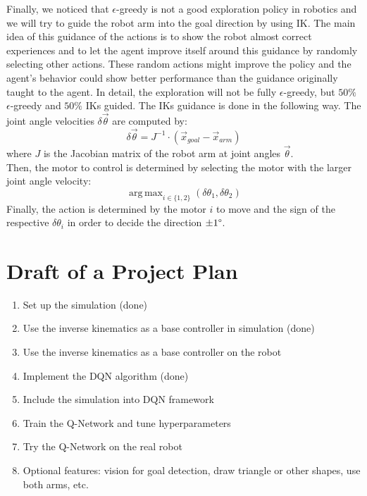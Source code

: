 \documentclass[a4paper,twoside, openright,12pt]{report}
\DeclareMathOperator*{\argmax}{arg\,max}
\begin{document}
Finally, we noticed that $\epsilon$-greedy is not a good exploration policy in robotics and we will try to guide the robot arm into the goal direction by using \ac{IK}. The main idea of this guidance of the actions is to show the robot almost correct experiences and to let the agent improve itself around this guidance by randomly selecting other actions. These random actions might improve the policy and the agent's behavior could show better performance than the guidance originally taught to the agent. In detail, the exploration will not be fully $\epsilon$-greedy, but $50\%$  $\epsilon$-greedy and $50\%$ \acp{IK} guided. The \acp{IK} guidance is done in the following way. The joint angle velocities $\delta \vec{\theta}$ are computed by:
\begin{equation}
\delta \vec{\theta} = J^{-1} \cdot (\vec{x}_{goal} - \vec{x}_{arm})
\end{equation}
where $J$ is the Jacobian matrix of the robot arm at joint angles $\vec{\theta}$.\\
Then, the motor to control is determined by selecting the motor with the larger joint angle velocity:
\begin{equation}
\argmax_{i \in \{1,2\}}(\delta \theta_1, \delta \theta_2)
\end{equation}
Finally, the action is determined by the motor $i$ to move and the sign of the respective $\delta \theta_i$ in order to decide the direction $\pm1\degree$.

\chapter*{Draft of a Project Plan}

\begin{enumerate}
\item Set up the simulation (done)
\item Use the inverse kinematics as a base controller in simulation (done)
\item Use the inverse kinematics as a base controller on the robot
\item Implement the \ac{DQN} algorithm (done)
\item Include the simulation into \ac{DQN} framework
\item Train the Q-Network and tune hyperparameters
\item Try the Q-Network on the real robot
\item Optional features: vision for goal detection, draw triangle or other shapes, use both arms, etc.
\end{enumerate}
\end{document}
